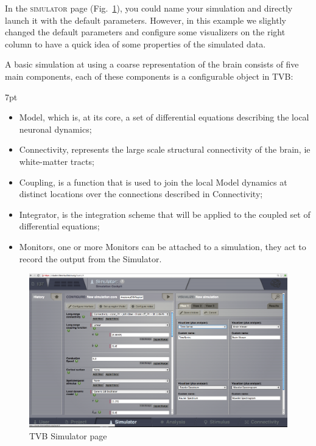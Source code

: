 \documentclass{tufte-handout}
\newenvironment{blah}{%
  \def\FrameCommand{%
    \hspace{1pt}%
    {\color{DarkOrange}\vrule width 2pt}%
    {\color{PeachPuff}\vrule width 4pt}%
    \colorbox{PeachPuff}%
  }%
  \MakeFramed{\advance\hsize-\width\FrameRestore}%
  \noindent\hspace{-4.55pt}%
  \begin{adjustwidth}{}{7pt}%
  \vspace{2pt}\vspace{2pt}%
}
{%
  \vspace{2pt}\end{adjustwidth}\endMakeFramed%
}
\begin{document}
In the \textsc{simulator} page (Fig.~\ref{fig:fig}), you could name your
simulation and directly launch it with the default parameters. However, in
this example we slightly changed the default parameters and configure some
visualizers on the right column to have a quick idea of some properties of the
simulated data.

A basic simulation at using a coarse representation of the brain consists of
five main components, each of these components is a configurable object in
TVB:

\begin{blah}
\begin{itemize}
\item Model, which is, at its core, a set of differential equations describing the local neuronal dynamics;
\item Connectivity, represents the large scale structural connectivity of the brain, ie white-matter tracts;
\item Coupling, is a function that is used to join the local Model dynamics at distinct locations over the connections described in Connectivity;
\item Integrator, is the integration scheme that will be applied to the coupled set of differential equations;
\item Monitors, one or more Monitors can be attached to a simulation, they act to record the output from the Simulator.
\end{itemize}
\end{blah}

\begin{figure}[h]
  \includegraphics[width=\linewidth]{Handout_UI_BuildingYourOwnBrainNetworkModel_SimulatorArea}%
  \caption{TVB Simulator page}%
  \label{fig:fig}%
\end{figure}
\end{document}
